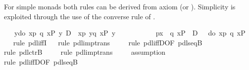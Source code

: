 \begin{isabellebody}
%
\begin{isamarkuptext}%
For simple monads \cite{SchroederMossakowski:PDL} both rules can be derived from
  axiom  (or ). Simplicity is
  exploited through the use of the converse rule of .%
\end{isamarkuptext}%
\isamarkuptrue%
\ {\isachardoublequote}{\isasymturnstile}\ {\isacharbrackleft}{\isacharhash}\ y{\isasymleftarrow}do\ {\isacharbraceleft}x{\isasymleftarrow}p{\isacharsemicolon}\ q\ x{\isacharbraceright}{\isacharbrackright}{\isacharparenleft}P\ y{\isacharparenright}\ {\isasymlongrightarrow}\isactrlsub D\ {\isacharbrackleft}{\isacharhash}\ x{\isasymleftarrow}p{\isacharsemicolon}\ y{\isasymleftarrow}q\ x{\isacharbrackright}{\isacharparenleft}P\ y{\isacharparenright}\ {\isasymLongrightarrow}\isanewline
\ \ \ \ \ \ \ {\isasymturnstile}\ {\isacharparenleft}\ {\isacharbrackleft}{\isacharhash}\ p{\isacharbrackright}{\isacharparenleft}{\isasymlambda}x{\isachardot}\ {\isacharbrackleft}{\isacharhash}\ q\ x{\isacharbrackright}P{\isacharparenright}\ {\isacharparenright}\ {\isasymlongleftrightarrow}\isactrlsub D\ {\isacharparenleft}\ {\isacharbrackleft}{\isacharhash}\ do\ {\isacharbraceleft}x{\isasymleftarrow}p{\isacharsemicolon}\ q\ x{\isacharbraceright}{\isacharbrackright}P\ {\isacharparenright}{\isachardoublequote}\isanewline
\ \ \isamarkupfalse%
rule\ pdl{\isacharunderscore}iffI{\isacharparenright}\isanewline
\ \ \isamarkupfalse%
rule\ pdl{\isacharunderscore}imp{\isacharunderscore}trans{\isacharparenright}\isanewline
\ \ \ \ \isamarkupfalse%
rule\ pdl{\isacharunderscore}iffD{}{\isacharbrackleft}OF\ pdl{\isacharunderscore}seqB{\isacharbrackright}{\isacharparenright}\isanewline
\ \ \ \ \isamarkupfalse%
rule\ pdl{\isacharunderscore}ctrB{\isacharparenright}\ \ %
\isanewline
\ \ \isamarkupfalse%
rule\ pdl{\isacharunderscore}imp{\isacharunderscore}trans{\isacharparenright}\isanewline
\ \ \ \ \isamarkupfalse%
assumption{\isacharparenright}\ \ \ \ \ %
\isanewline
\ \ \ \ \isamarkupfalse%
rule\ pdl{\isacharunderscore}iffD{}{\isacharbrackleft}OF\ pdl{\isacharunderscore}seqB{\isacharbrackright}{\isacharparenright}\isanewline

\end{isabellebody}
